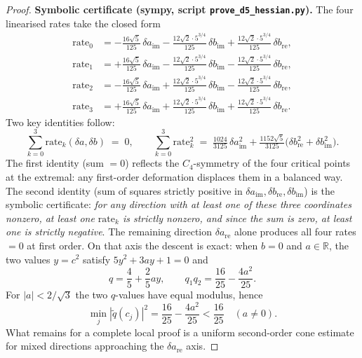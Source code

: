 \documentclass[11pt,a4paper]{article}
\begin{document}
\begin{proof}
\textbf{Symbolic certificate (sympy, script \texttt{prove\_d5\_hessian.py}).} The four linearised rates take the closed form
\begin{align*}
\mathrm{rate}_0 &= -\tfrac{16\sqrt 5}{125}\,\delta a_{\mathrm{im}} - \tfrac{12\sqrt 2 \cdot 5^{3/4}}{125}\,\delta b_{\mathrm{im}} + \tfrac{12\sqrt 2 \cdot 5^{3/4}}{125}\,\delta b_{\mathrm{re}}, \\
\mathrm{rate}_1 &= +\tfrac{16\sqrt 5}{125}\,\delta a_{\mathrm{im}} - \tfrac{12\sqrt 2 \cdot 5^{3/4}}{125}\,\delta b_{\mathrm{im}} - \tfrac{12\sqrt 2 \cdot 5^{3/4}}{125}\,\delta b_{\mathrm{re}}, \\
\mathrm{rate}_2 &= -\tfrac{16\sqrt 5}{125}\,\delta a_{\mathrm{im}} + \tfrac{12\sqrt 2 \cdot 5^{3/4}}{125}\,\delta b_{\mathrm{im}} - \tfrac{12\sqrt 2 \cdot 5^{3/4}}{125}\,\delta b_{\mathrm{re}}, \\
\mathrm{rate}_3 &= +\tfrac{16\sqrt 5}{125}\,\delta a_{\mathrm{im}} + \tfrac{12\sqrt 2 \cdot 5^{3/4}}{125}\,\delta b_{\mathrm{im}} + \tfrac{12\sqrt 2 \cdot 5^{3/4}}{125}\,\delta b_{\mathrm{re}}.
\end{align*}
Two key identities follow:
\begin{equation}
\sum_{k=0}^3 \mathrm{rate}_k(\delta a, \delta b) \;=\; 0, \qquad \sum_{k=0}^3 \mathrm{rate}_k^2 \;=\; \tfrac{1024}{3125}\,\delta a_{\mathrm{im}}^2 + \tfrac{1152\sqrt 5}{3125}\bigl(\delta b_{\mathrm{re}}^2 + \delta b_{\mathrm{im}}^2\bigr).
\label{eq:hessian-cert}
\end{equation}
The first identity (sum $= 0$) reflects the $C_4$-symmetry of the four critical points at the extremal: any first-order deformation displaces them in a balanced way. The second identity (sum of squares strictly positive in $\delta a_{\mathrm{im}}, \delta b_{\mathrm{re}}, \delta b_{\mathrm{im}}$) is the symbolic certificate: \emph{for any direction with at least one of these three coordinates nonzero, at least one $\mathrm{rate}_k$ is strictly nonzero, and since the sum is zero, at least one is strictly negative}. The remaining direction $\delta a_{\mathrm{re}}$ alone produces all four rates $= 0$ at first order. On that axis the descent is exact: when $b=0$ and $a\in\mathbb{R}$, the two values $y=c^2$ satisfy $5y^2+3ay+1=0$ and
\[
q = \frac45+\frac25 ay,
\qquad
q_1q_2=\frac{16}{25}-\frac{4a^2}{25}.
\]
For $|a|<2/\sqrt3$ the two $q$-values have equal modulus, hence
\[
\min_j |\tilde q(c_j)|^2=\frac{16}{25}-\frac{4a^2}{25}<\frac{16}{25}
\quad (a\ne0).
\]
What remains for a complete local proof is a uniform second-order cone estimate
for mixed directions approaching the $\delta a_{\mathrm{re}}$ axis.


\end{proof}
\end{document}
